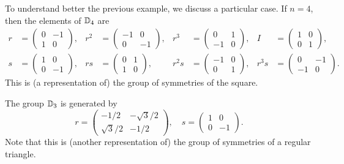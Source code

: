 To understand better the previous example, 
we discuss a particular case. 
If $n=4$, 
then the elements of $\mathbb{D}_4$ are  
\begin{align*}
r&=\begin{pmatrix}
0 & -1\\
1 & 0
\end{pmatrix},
&
r^2&=\begin{pmatrix}
    -1 & 0\\
    0 & -1
\end{pmatrix},
&r^3&=\begin{pmatrix}
0 & 1\\
-1 & 0
\end{pmatrix},
&
I&=\begin{pmatrix}
        1 & 0\\
        0 & 1
\end{pmatrix},\\
s&=\begin{pmatrix}
1 & 0\\
0 & -1
\end{pmatrix},
&
rs&=\begin{pmatrix}
    0 & 1\\
    1 & 0
\end{pmatrix},
&r^2s&=\begin{pmatrix}
-1 & 0\\
0 & 1
\end{pmatrix},
&
r^3s&=\begin{pmatrix}
    0 & -1\\
    -1 & 0
\end{pmatrix}.
\end{align*}
This is (a representation of) the group of symmetries of the square. 

\begin{exercise}
The group $\mathbb{D}_3$ is generated by 
\[
r=\begin{pmatrix}
-1/2 & -\sqrt{3}/2\\
\sqrt{3}/2 & -1/2
\end{pmatrix},
\quad
s=\begin{pmatrix}
        1 & 0\\
        0 & -1
\end{pmatrix}.
\]
Note that this is (another representation of) the group of symmetries of a regular 
triangle. 
\end{exercise}

